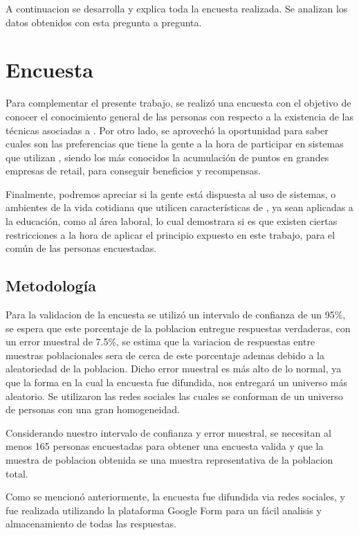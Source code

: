 A continuacion se desarrolla y explica toda la encuesta realizada. Se analizan los datos obtenidos 
con esta pregunta a pregunta. 

\section{Encuesta}

Para complementar el presente trabajo, se realizó una encuesta con el objetivo de
conocer el conocimiento general de las personas con respecto a la existencia
de las técnicas asociadas a {\GAM}.
Por otro lado, se aprovechó la oportunidad para saber cuales son las preferencias
que tiene la gente a la hora de participar en sistemas que utilizan {\GAM},
siendo los más conocidos la acumulación de puntos en grandes empresas de retail,
para conseguir beneficios y recompensas.

Finalmente, podremos apreciar si la gente está dispuesta al uso de sistemas,
o ambientes de la vida cotidiana que utilicen características de {\GAM},
ya sean aplicadas a la educación, como al área laboral, lo cual demostrara
 si es que existen ciertas restricciones a la hora de aplicar
el principio expuesto en este trabajo, para el común de las personas
encuestadas.

\subsection{Metodología}

Para la validacion de la encuesta se utilizó un intervalo de confianza de un 95\%, se espera que
este porcentaje de la poblacion entregue respuestas verdaderas, con un error
muestral de 7.5\%, se estima que la variacion de respuestas entre muestras poblacionales
 sera de cerca de este porcentaje ademas debido a la aleatoriedad de la poblacion.
Dicho error muestral es más alto de lo normal, ya que la forma en la cual la encuesta fue difundida,
 nos entregará un universo más aleatorio. Se utilizaron las redes sociales las cuales 
se conforman de un universo de personas con una gran homogeneidad.

Considerando nuestro intervalo de confianza y error muestral, se necesitan al menos 165
personas encuestadas para obtener una encuesta valida y que la muestra de poblacion obtenida
se una muestra representativa de la poblacion total.

Como se mencionó anteriormente, la encuesta fue difundida via redes sociales,
y fue realizada utilizando la plataforma Google Form para un fácil analisis y almacenamiento
 de todas las respuestas.

